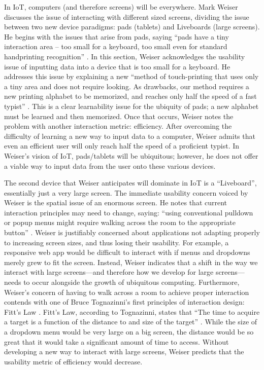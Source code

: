 \documentclass[11pt, oneside]{article}   	%
\begin{document}
In IoT, computers (and therefore screens) will be everywhere. Mark Weiser discusses the issue of interacting with different sized screens, dividing the issue between two new device paradigms: pads (tablets) and Liveboards (large screens). He begins with the issues that arise from pads, saying ``pads have a tiny interaction area -- too small for a keyboard, too small even for standard handprinting recognition'' \cite{weiser}. In this section, Weiser acknowledges the usability issue of inputting data into a device that is too small for a keyboard. He addresses this issue by explaining a new ``method of touch-printing that uses only a tiny area and does not require looking. As drawbacks, our method requires a new printing alphabet to be memorized, and reaches only half the speed of a fast typist'' \cite{weiser}. This is a clear learnability issue for the ubiquity of pads; a new alphabet must be learned and then memorized. Once that occurs, Weiser notes the problem with another interaction metric: efficiency. After overcoming the difficulty of learning a new way to input data to a computer, Weiser admits that even an efficient user will only reach half the speed of a proficient typist. In Weiser's vision of IoT, pads/tablets will be ubiquitous; however, he does not offer a viable way to input data from the user onto these various devices.

The second device that Weiser anticipates will dominate in IoT is a ``Liveboard'', essentially just a very large screen. The immediate usability concern voiced by Weiser is the spatial issue of an enormous screen. He notes that current interaction principles may need to change, saying: ``using conventional pulldown or popup menus might require walking across the room to the appropriate button'' \cite{weiser}. Weiser is justifiably concerned about applications not adapting properly to increasing screen sizes, and thus losing their usability. For example, a responsive web app would be difficult to interact with if menus and dropdowns merely grew to fit the screen. Instead, Weiser indicates that a shift in the way we interact with large screens---and therefore how we develop for large screens---needs to occur alongside the growth of ubiquitous computing. Furthermore, Weiser's concern of having to walk across a room to achieve proper interaction contends with one of Bruce Tognazinni's first principles of interaction design: Fitt's Law \cite{asktog}. Fitt's Law, according to Tognazinni, states that ``The time to acquire a target is a function of the distance to and size of the target'' \cite{asktog}. While the size of a dropdown menu would be very large on a big screen, the distance would be so great that it would take a significant amount of time to access. Without developing a new way to interact with large screens, Weiser predicts that the usability metric of efficiency would decrease.
\end{document}
